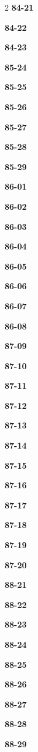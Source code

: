 \documentclass[10pt,a4paper]{article}
\begin{document}
\begin{multicols}{2}
\noindent\textbf{84-21}\ \par
\noindent\textbf{84-22}\ \par
\noindent\textbf{84-23}\ \par
\noindent\textbf{85-24}\ \par
\noindent\textbf{85-25}\ \par
\noindent\textbf{85-26}\ \par
\noindent\textbf{85-27}\ \par
\noindent\textbf{85-28}\ \par
\noindent\textbf{85-29}\ \par
\noindent\textbf{86-01}\ \par
\noindent\textbf{86-02}\ \par
\noindent\textbf{86-03}\ \par
\noindent\textbf{86-04}\ \par
\noindent\textbf{86-05}\ \par
\noindent\textbf{86-06}\ \par
\noindent\textbf{86-07}\ \par
\noindent\textbf{86-08}\ \par
\noindent\textbf{87-09}\ \par
\noindent\textbf{87-10}\ \par
\noindent\textbf{87-11}\ \par
\noindent\textbf{87-12}\ \par
\noindent\textbf{87-13}\ \par
\noindent\textbf{87-14}\ \par
\noindent\textbf{87-15}\ \par
\noindent\textbf{87-16}\ \par
\noindent\textbf{87-17}\ \par
\noindent\textbf{87-18}\ \par
\noindent\textbf{87-19}\ \par
\noindent\textbf{87-20}\ \par
\noindent\textbf{88-21}\ \par
\noindent\textbf{88-22}\ \par
\noindent\textbf{88-23}\ \par
\noindent\textbf{88-24}\ \par
\noindent\textbf{88-25}\ \par
\noindent\textbf{88-26}\ \par
\noindent\textbf{88-27}\ \par
\noindent\textbf{88-28}\ \par
\noindent\textbf{88-29}\ \par

\end{multicols}
\end{document}
